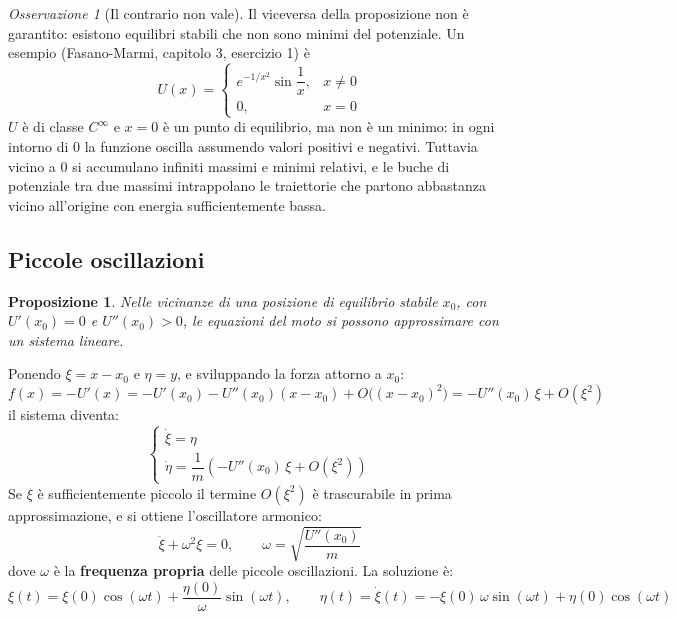 \documentclass[11pt, a4paper, openright]{book}
\theoremstyle{plain}
\newtheorem{proposizione}[teorema]{Proposizione}
\theoremstyle{definition}
\theoremstyle{remark}
\newtheorem{osservazione}[teorema]{Osservazione}
\begin{document}
\begin{osservazione}[Il contrario non vale]
    Il viceversa della proposizione non è garantito: esistono equilibri stabili che non sono minimi del potenziale. Un esempio (Fasano-Marmi, capitolo 3, esercizio 1) è
    \begin{equation}
        U(x) =
        \begin{cases}
            e^{-1/x^2}\sin\dfrac{1}{x}, & x \neq 0 \\
            0, & x = 0
        \end{cases}
    \end{equation}
    $U$ è di classe $C^\infty$ e $x = 0$ è un punto di equilibrio, ma non è un minimo: in ogni intorno di $0$ la funzione oscilla assumendo valori positivi e negativi. Tuttavia vicino a $0$ si accumulano infiniti massimi e minimi relativi, e le buche di potenziale tra due massimi intrappolano le traiettorie che partono abbastanza vicino all'origine con energia sufficientemente bassa.
\end{osservazione}

\subsection{Piccole oscillazioni}
\begin{proposizione}
    Nelle vicinanze di una posizione di equilibrio stabile $x_0$, con $U'(x_0) = 0$ e $U''(x_0) > 0$, le equazioni del moto si possono approssimare con un sistema lineare.
\end{proposizione}

Ponendo $\xi = x - x_0$ e $\eta = y$, e sviluppando la forza attorno a $x_0$:
\begin{equation}
    f(x) = -U'(x) = -U'(x_0) - U''(x_0)(x - x_0) + O\big((x - x_0)^2\big) = -U''(x_0)\,\xi + O(\xi^2)
\end{equation}
il sistema diventa:
\begin{equation}
    \begin{cases}
        \dot{\xi} = \eta \\
        \dot{\eta} = \dfrac{1}{m}\left(-U''(x_0)\,\xi + O(\xi^2)\right)
    \end{cases}
\end{equation}
Se $\xi$ è sufficientemente piccolo il termine $O(\xi^2)$ è trascurabile in prima approssimazione, e si ottiene l'oscillatore armonico:
\begin{equation}
    \ddot{\xi} + \omega^2\xi = 0, \qquad \omega = \sqrt{\frac{U''(x_0)}{m}}
\end{equation}
dove $\omega$ è la \textbf{frequenza propria} delle piccole oscillazioni. La soluzione è:
\begin{equation}
    \xi(t) = \xi(0)\cos(\omega t) + \frac{\eta(0)}{\omega}\sin(\omega t), \qquad \eta(t) = \dot{\xi}(t) = -\xi(0)\,\omega\sin(\omega t) + \eta(0)\cos(\omega t)
\end{equation}
\end{document}

